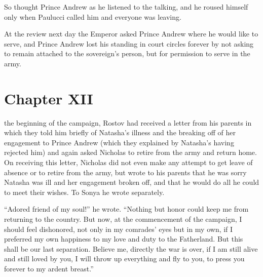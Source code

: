 So thought Prince Andrew as he listened to the talking, and he
roused himself only when Paulucci called him and everyone was
leaving.

At the review next day the Emperor asked Prince Andrew where he
would like to serve, and Prince Andrew lost his standing in court
circles forever by not asking to remain attached to the
sovereign's person, but for permission to serve in the army.


\chapter*{Chapter XII}
\ifaudio     
{} 
\fi

 the beginning of the campaign, Rostov had received a
letter from his parents in which they told him briefly of
Natasha's illness and the breaking off of her engagement to
Prince Andrew (which they explained by Natasha's having rejected
him) and again asked Nicholas to retire from the army and return
home. On receiving this letter, Nicholas did not even make any
attempt to get leave of absence or to retire from the army, but
wrote to his parents that he was sorry Natasha was ill and her
engagement broken off, and that he would do all he could to meet
their wishes. To Sonya he wrote separately.

``Adored friend of my soul!'' he wrote. ``Nothing but honor could
keep me from returning to the country. But now, at the
commencement of the campaign, I should feel dishonored, not only
in my comrades' eyes but in my own, if I preferred my own
happiness to my love and duty to the Fatherland. But this shall
be our last separation. Believe me, directly the war is over, if
I am still alive and still loved by you, I will throw up
everything and fly to you, to press you forever to my ardent
breast.''

